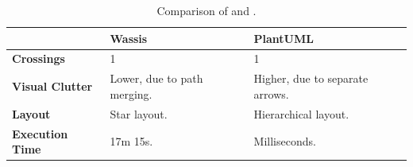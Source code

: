 \documentclass[../../main.tex]{subfiles}
\begin{document}
\begin{table}[ht]
    \centering
    \begin{tabular}{p{} p{} p{}}
        & \textbf{Wassis} & \textbf{PlantUML} \\ 
        
        \hline

        \textbf{Crossings}
        & 1
        & 1 \\

        \textbf{Visual Clutter}
        & Lower, due to path merging.
        & Higher, due to separate arrows. \\

        \textbf{Layout}
        & Star layout.
        & Hierarchical layout. \\

        \textbf{Execution Time}
        & 17m 15s.
        & Milliseconds. \\ 

        \hline
    \end{tabular}
    \caption{Comparison of \wassis and \plantuml.}
    \label{tab:wassis_plantuml_multi_rel_summary}
\end{table}
\end{document}
